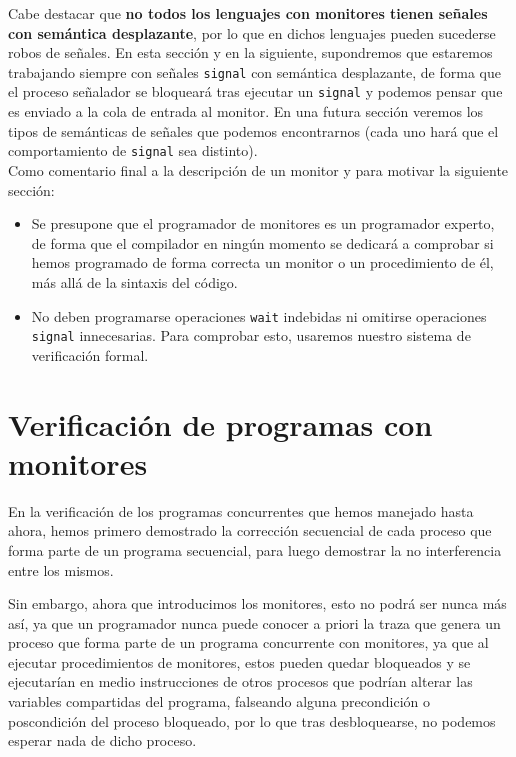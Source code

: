 Cabe destacar que \textbf{no todos los lenguajes con monitores tienen señales con semántica desplazante}, por lo que en dichos lenguajes pueden sucederse robos de señales. En esta sección y en la siguiente, supondremos que estaremos trabajando siempre con señales \verb|signal| con semántica desplazante, de forma que el proceso señalador se bloqueará tras ejecutar un \verb|signal| y podemos pensar que es enviado a la cola de entrada al monitor. En una futura sección veremos los tipos de semánticas de señales que podemos encontrarnos (cada uno hará que el comportamiento de \verb|signal| sea distinto).\\

\noindent
Como comentario final a la descripción de un monitor y para motivar la siguiente sección:
\begin{itemize}
    \item Se presupone que el programador de monitores es un programador experto, de forma que el compilador en ningún momento se dedicará a comprobar si hemos programado de forma correcta un monitor o un procedimiento de él, más allá de la sintaxis del código.
    \item No deben programarse operaciones \verb|wait| indebidas ni omitirse operaciones \verb|signal| innecesarias. Para comprobar esto, usaremos nuestro sistema de verificación formal.
\end{itemize}

\section{Verificación de programas con monitores}
En la verificación de los programas concurrentes que hemos manejado hasta ahora, hemos primero demostrado la corrección secuencial de cada proceso que forma parte de un programa secuencial, para luego demostrar la no interferencia entre los mismos. 

Sin embargo, ahora que introducimos los monitores, esto no podrá ser nunca más así, ya que un programador nunca puede conocer a priori la traza que genera un proceso que forma parte de un programa concurrente con monitores, ya que al ejecutar procedimientos de monitores, estos pueden quedar bloqueados y se ejecutarían en medio instrucciones de otros procesos que podrían alterar las variables compartidas del programa, falseando alguna precondición o poscondición del proceso bloqueado, por lo que tras desbloquearse, no podemos esperar nada de dicho proceso.\\


